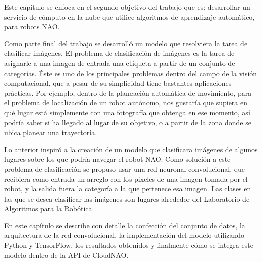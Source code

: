%
%

Este capítulo se enfoca en el segundo 
objetivo del trabajo que es: desarrollar un 
servicio de cómputo en la nube que utilice 
algoritmos de aprendizaje automático, para 
robots NAO.

Como parte final del trabajo se desarrolló un modelo que resolviera la tarea de clasificar imágenes.
El problema de clasificación de imágenes es la tarea de asignarle a una imagen de
entrada una etiqueta a partir de un conjunto de categorías. Éste es uno de los principales
problemas dentro del campo de la visión computacional, que a pesar de su simplicidad
tiene bastantes aplicaciones prácticas. Por ejemplo, dentro de la planeación automática de movimiento, para el problema de localización de un robot
autónomo, nos gustaría que supiera en qué lugar está simplemente con una fotografía
que obtenga en ese momento, así podría saber si ha llegado al lugar de su objetivo, o a partir de la zona donde se ubica planear una trayectoria.

Lo anterior inspiró a la creación de un modelo que clasificara imágenes
de algunos lugares sobre los que podría navegar el robot NAO. 
Como solución a este problema de clasificación se propuso usar 
una red neuronal convolucional, que recibiera como entrada un arreglo con los
pixeles de una imagen tomada por el robot, y la salida fuera la categoría
a la que pertenece esa imagen. 
Las clases en las que se desea clasificar las imágenes son lugares alrededor
del Laboratorio de Algoritmos para la Robótica.

En este capítulo se describe con detalle la confección del conjunto de datos, la arquitectura de la red 
convolucional, la implementación
del modelo utilizando Python y TensorFlow, los resultados obtenidos
y finalmente cómo se integra este modelo dentro de la API de CloudNAO. 

%
%